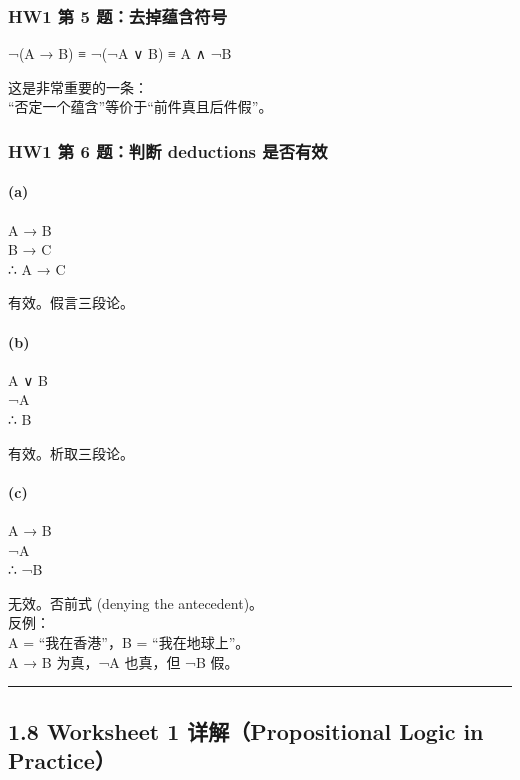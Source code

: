 \documentclass[
  11pt,
]{article}
\begin{document}
\subsubsection{HW1 第 5
题：去掉蕴含符号}\label{hw1-ux7b2c-5-ux9898ux53bbux6389ux8574ux542bux7b26ux53f7}

¬(A → B) ≡ ¬(¬A ∨ B) ≡ A ∧ ¬B

这是非常重要的一条：\\
``否定一个蕴含''等价于``前件真且后件假''。

\subsubsection{HW1 第 6 题：判断 deductions
是否有效}\label{hw1-ux7b2c-6-ux9898ux5224ux65ad-deductions-ux662fux5426ux6709ux6548}

\paragraph{(a)}\label{a}

A → B\\
B → C\\
∴ A → C

有效。假言三段论。

\paragraph{(b)}\label{b}

A ∨ B\\
¬A\\
∴ B

有效。析取三段论。

\paragraph{(c)}\label{c}

A → B\\
¬A\\
∴ ¬B

无效。否前式 (denying the antecedent)。\\
反例：\\
A = ``我在香港''，B = ``我在地球上''。\\
A → B 为真，¬A 也真，但 ¬B 假。

\begin{center}\rule{0.5\linewidth}{0.5pt}\end{center}

\subsection{1.8 Worksheet 1 详解（Propositional Logic in
Practice）}\label{worksheet-1-ux8be6ux89e3propositional-logic-in-practice}
\end{document}
